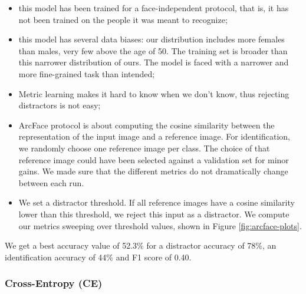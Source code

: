 \begin{itemize}
    \item this model has been trained for a face-independent protocol, that is, it has not been trained on the people it was meant to recognize;
    \item this model has several data biases: our distribution includes more females than males, very few above the age of 50. The training set is broader than this narrower distribution of ours. The model is faced with a narrower and more fine-grained task than intended;
    \item Metric learning makes it hard to know when we don't know, thus rejecting distractors is not easy;
    \item ArcFace protocol is about computing the cosine similarity between the representation of the input image and a reference image. For identification, we randomly choose one reference image per class. The choice of that reference image could have been selected against a validation set for minor gains. We made sure that the different metrics do not dramatically change between each run.
    \item We set a distractor threshold. If all reference images have a cosine similarity lower than this threshold, we reject this input as a distractor. We compute our metrics sweeping over threshold values, shown in Figure \ref{fig:arcface-plots}.
\end{itemize}


We get a best accuracy value of 52.3\% for a distractor accuracy of 78\%, an identification accuracy of 44\% and F1 score of 0.40.

\subsubsection{Cross-Entropy (CE)}

